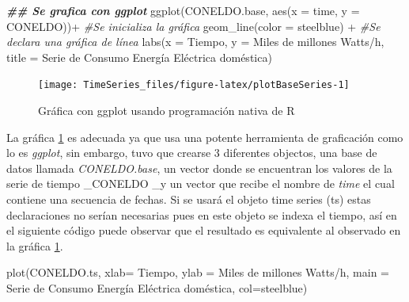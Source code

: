 \documentclass[
  spanish,
]{book}
\newenvironment{Shaded}{\begin{snugshade}}{\end{snugshade}}
\newcommand{\AttributeTok}[1]{\textcolor[rgb]{0.77,0.63,0.00}{#1}}
\newcommand{\CommentTok}[1]{\textcolor[rgb]{0.56,0.35,0.01}{\textit{#1}}}
\newcommand{\DocumentationTok}[1]{\textcolor[rgb]{0.56,0.35,0.01}{\textbf{\textit{#1}}}}
\newcommand{\FunctionTok}[1]{\textcolor[rgb]{0.00,0.00,0.00}{#1}}
\newcommand{\NormalTok}[1]{#1}
\newcommand{\SpecialCharTok}[1]{\textcolor[rgb]{0.00,0.00,0.00}{#1}}
\newcommand{\StringTok}[1]{\textcolor[rgb]{0.31,0.60,0.02}{#1}}
\theoremstyle{remark}
\begin{document}
\begin{Shaded}
\begin{Highlighting}[]
\DocumentationTok{\#\# Se grafica con ggplot}
\FunctionTok{ggplot}\NormalTok{(CONELDO.base, }\FunctionTok{aes}\NormalTok{(}\AttributeTok{x =}\NormalTok{ time, }\AttributeTok{y =}\NormalTok{ CONELDO))}\SpecialCharTok{+} \CommentTok{\#Se inicializa la gráfica}
  \FunctionTok{geom\_line}\NormalTok{(}\AttributeTok{color =} \StringTok{\textquotesingle{}steelblue\textquotesingle{}}\NormalTok{) }\SpecialCharTok{+} \CommentTok{\#Se declara una gráfica de línea}
  \FunctionTok{labs}\NormalTok{(}\AttributeTok{x =} \StringTok{\textquotesingle{}Tiempo\textquotesingle{}}\NormalTok{, }\AttributeTok{y =} \StringTok{\textquotesingle{}Miles de millones Watts/h\textquotesingle{}}\NormalTok{, }
        \AttributeTok{title =} \StringTok{\textquotesingle{}Serie de Consumo Energía Eléctrica doméstica\textquotesingle{}}\NormalTok{)}
\end{Highlighting}
\end{Shaded}

\begin{figure}

{\centering \texttt{[image: TimeSeries\_files/figure-latex/plotBaseSeries-1]} 

}

\caption{Gráfica con ggplot usando programación nativa de R}\label{fig:plotBaseSeries}
\end{figure}

La gráfica \ref{fig:plotBaseSeries} es adecuada ya que usa una potente herramienta de graficación como lo es \emph{ggplot}, sin embargo, tuvo que crearse 3 diferentes objectos, una base de datos llamada \emph{CONELDO.base}, un vector donde se encuentran los valores de la serie de tiempo \_CONELDO \_y un vector que recibe el nombre de \emph{time} el cual contiene una secuencia de fechas. Si se usará el objeto time series (ts) estas declaraciones no serían necesarias pues en este objeto se indexa el tiempo, así en el siguiente código puede observar que el resultado es equivalente al observado en la gráfica \ref{fig:plotBaseSeries}.

\begin{Shaded}
\begin{Highlighting}[]
\FunctionTok{plot}\NormalTok{(CONELDO.ts,  }\AttributeTok{xlab=} \StringTok{\textquotesingle{}Tiempo\textquotesingle{}}\NormalTok{, }
     \AttributeTok{ylab =} \StringTok{\textquotesingle{}Miles de millones Watts/h\textquotesingle{}}\NormalTok{,}
     \AttributeTok{main =} \StringTok{\textquotesingle{}Serie de Consumo Energía Eléctrica doméstica\textquotesingle{}}\NormalTok{,}
     \AttributeTok{col=}\StringTok{\textquotesingle{}steelblue\textquotesingle{}}\NormalTok{)}
\end{Highlighting}
\end{Shaded}
\end{document}
